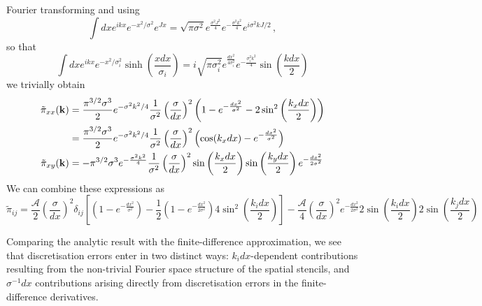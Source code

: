 \documentclass{revtex4}
\begin{document}
Fourier transforming and using
\begin{equation}
  \int dx e^{ikx}e^{-x^2/\sigma^2}e^{Jx} = \sqrt{\pi\sigma^2}e^{\frac{\sigma^2 J^2}{4}}e^{-\frac{\sigma^2 k^2}{4}}e^{i\sigma^2kJ/2} \, ,
\end{equation}
so that
\begin{equation}
  \int dx e^{ikx}e^{-x^2/\sigma_i^2}\sinh\left(\frac{xdx}{\sigma_i}\right) = i\sqrt{\pi\sigma_i^2}e^{\frac{dx^2}{4\sigma_i^2}}e^{-\frac{\sigma_i^2k^2}{4}}\sin\left(\frac{kdx}{2}\right)
\end{equation}
we trivially obtain
\begin{subequations}
\begin{align}
  \tilde{\pi}_{xx}({\bf k}) &= \frac{\pi^{3/2}\sigma^3}{2}e^{-\sigma^2 k^2/4}\frac{1}{\sigma^2}\left(\frac{\sigma}{dx}\right)^2\left(1-e^{-\frac{dx^2}{\sigma^2}} - 2\sin^2\left(\frac{k_xdx}{2}\right)\right) \\
  &= \frac{\pi^{3/2}\sigma^3}{2}e^{-\sigma^2 k^2/4}\frac{1}{\sigma^2}\left(\frac{\sigma}{dx}\right)^2\left(\cos(k_xdx) - e^{-\frac{dx^2}{\sigma^2}}\right) \\
  \tilde{\pi}_{xy}({\bf k}) &= -\pi^{3/2}\sigma^3e^{-\frac{\sigma^2k^2}{4}}\frac{1}{\sigma^2}\left(\frac{\sigma}{dx}\right)^2\sin\left(\frac{k_xdx}{2}\right)\sin\left(\frac{k_ydx}{2}\right)e^{-\frac{dx^2}{2\sigma^2}}
\end{align}
\end{subequations}
We can combine these expressions as
\begin{equation}
  \tilde{\pi}_{ij} = \frac{\mathcal{A}}{2}\left(\frac{\sigma}{dx}\right)^2\delta_{ij}\left[\left(1-e^{-\frac{dx^2}{\sigma^2}}\right) - \frac{1}{2}\left(1-e^{-\frac{dx^2}{2\sigma^2}}\right)4\sin^2\left(\frac{k_idx}{2}\right)\right] - \frac{\mathcal{A}}{4}\left(\frac{\sigma}{dx}\right)^2e^{-\frac{dx^2}{2\sigma^2}}2\sin\left(\frac{k_idx}{2}\right)2\sin\left(\frac{k_jdx}{2}\right)
\end{equation}

Comparing the analytic result with the finite-difference approximation, we see that discretisation errors enter in two distinct ways: $k_idx$-dependent contributions resulting from the non-trivial Fourier space structure of the spatial stencils, and $\sigma^{-1}dx$ contributions arising directly from discretisation errors in the finite-difference derivatives.
\end{document}
